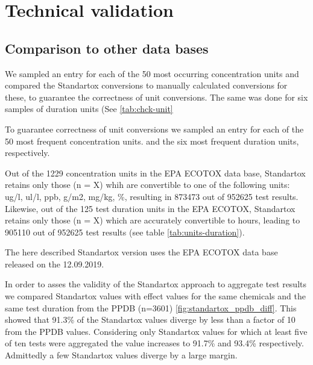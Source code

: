 
\section{Technical validation}

\subsection{Comparison to other data bases}

We sampled an entry for each of the 50 most occurring concentration units and compared the Standartox conversions to manually calculated conversions for these, to guarantee the correctness of unit conversions. The same was done for six samples of duration units (See \ref{tab:chck-unit}

To guarantee correctness of unit conversions we sampled an entry for each of the 50 most frequent concentration units. and the six most frequent duration units, respectively.

Out of the 1229 concentration units in the EPA ECOTOX data base, Standartox retains only those (n = X) whih are convertible to one of the following units: ug/l, ul/l, ppb, g/m2, mg/kg, \%, resulting in 873473 out of 952625 test results. Likewise, out of the 125 test duration units in the EPA ECOTOX, Standartox retains only those (n = X) which are accurately convertible to hours, leading to 905110 out of 952625 test results (see table \ref{tab:units-duration}). %

The here described Standartox version uses the EPA ECOTOX data base released on the 12.09.2019.


In order to asses the validity of the Standartox approach to aggregate test results we compared Standartox values with effect values for the same chemicals and the same test duration from the PPDB (n=3601) \ref{fig:standartox_ppdb_diff}. This showed that 91.3\% of the Standartox values diverge by less than a factor of 10 from the PPDB values. Considering only Standartox values for which at least five of ten tests were aggregated the value increases to 91.7\% and 93.4\% respectively. Admittedly a few Standartox values diverge by a large margin.

